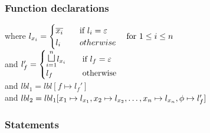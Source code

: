 \subsubsection{Function declarations}

        {}
        {}
        {where $l_{x_i} = \begin{cases}
          \overline{x_i} & \quad \text{if } l_i = \varepsilon \\
          l_i & \quad otherwise
        \end{cases}\quad \text{for } 1 \leq i \leq n$ \\
          and $l_f' = \begin{cases}
            \mathlarger\sqcupl_{i = 1}^n l_{x_i} & \quad \text{if } l_f = \varepsilon \\
            l_f & \quad \text{otherwise}
        \end{cases}$ \\
          and $lbl_1 = lbl[f \mapsto l_f']$ \\
          and $lbl_2 = lbl_1[x_1 \mapsto l_{x_1}, x_2 \mapsto l_{x_2}, \dots, x_n \mapsto l_{x_n}, \phi \mapsto l_f']$}

\subsubsection{Statements}

